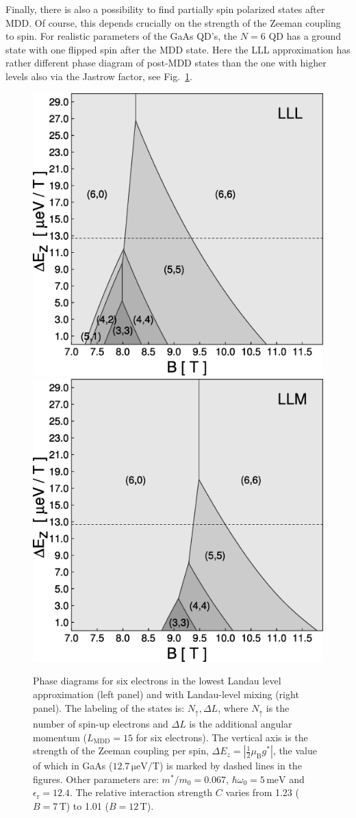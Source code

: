 \documentclass{article}
\begin{document}
Finally, there is also a possibility to find partially spin polarized
states after MDD\cite{RapidSpin}. Of course, this depends crucially on
the strength of the Zeeman coupling to spin. For realistic parameters
of the GaAs QD's, the $N=6$ QD has a ground state with one flipped
spin after the MDD state.  Here the LLL approximation has rather
different phase diagram of post-MDD states than the one with higher
levels also via the Jastrow factor, see Fig.~\ref{spin}.
%
\begin{figure}[hbt]
  \includegraphics[width=0.49\columnwidth]{phase_6LLL_new}
  \includegraphics[width=0.49\columnwidth]{phase_6LLM_new}
\caption{Phase diagrams for six electrons in the lowest Landau level
approximation (left panel) and with Landau-level mixing (right panel).
The labeling of the states is: $N_{\uparrow}, \Delta L$, where
$N_{\uparrow}$ is the number of spin-up electrons and $\Delta L$ is
the additional angular momentum ($L_{\mathrm{MDD}}=15$ for six
electrons).  The vertical axis is the strength of the Zeeman coupling
per spin, $\Delta {E_z} = |\frac{1}{2} \mu_{\mathrm{B}} g^{\ast}|$,
the value of which in GaAs ($12.7\, \mathrm{\mu eV/T}$) is marked by
dashed lines in the figures.  Other parameters are: $m^{\ast}/m_0 =
0.067$, $\hbar \omega_{0} = 5\, \mathrm{meV}$ and
$\epsilon_{\mathrm{r}} = 12.4$.  The relative interaction strength $C$
varies from 1.23 ($B=7\, \mathrm{ T}$) to 1.01 ($B=12\, \mathrm{T}$).
}
\label{spin}
\end{figure}
%
\end{document}
